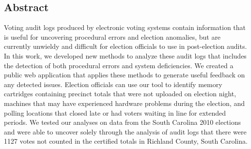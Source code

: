 
\subsection*{Abstract}
Voting audit logs produced by electronic voting systems contain information that is useful for uncovering procedural errors and election anomalies, but are currently unwieldy and difficult for election officials to use in post-election audits. In this work, we developed new methods to analyze these audit logs that includes the detection of both procedural errors and system deficiencies. We created a public web application that applies these methods to generate useful feedback on any detected issues. Election officials can use our tool to identify memory cartridges containing precinct totals that were not uploaded on election night, machines that may have experienced hardware problems during the election, and polling locations that closed late or had voters waiting in line for extended periods. We tested our analyses on data from the South Carolina 2010 elections and were able to uncover solely through the analysis of audit logs that there were 1127 votes not counted in the certified totals in Richland County, South Carolina.
